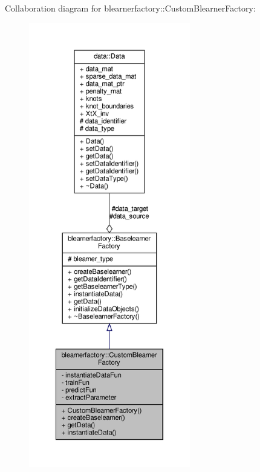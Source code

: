 Collaboration diagram for blearnerfactory\+:\+:Custom\+Blearner\+Factory\+:\nopagebreak
\begin{figure}[H]
\begin{center}
\leavevmode
\includegraphics[height=550pt]{classblearnerfactory_1_1_custom_blearner_factory__coll__graph}
\end{center}
\end{figure}
